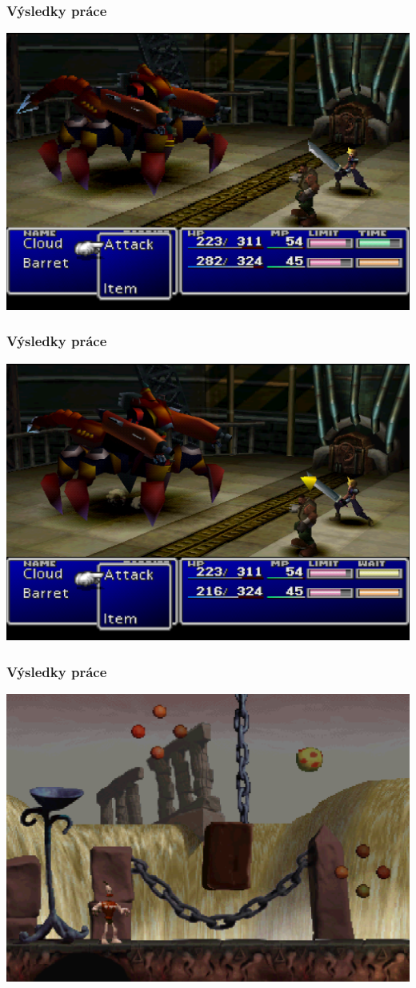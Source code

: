 \begin{frame}
  \frametitle{Výsledky práce}
  \includegraphics[width=1\textwidth]{img/ff7-lowres.png}
\end{frame}

\begin{frame}
  \frametitle{Výsledky práce}
  \includegraphics[width=1\textwidth]{img/ff7-highres.png}
\end{frame}

\begin{frame}
  \frametitle{Výsledky práce}
  \includegraphics[width=1\textwidth]{img/skull-lowres.png}
\end{frame}

